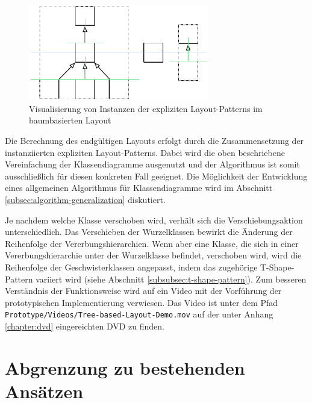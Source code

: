 \begin{figure}[hbt]
    \centering
    \includegraphics[width=0.7\textwidth]{resources/tree-based-layout}
    \caption{Visualisierung von Instanzen der expliziten Layout-Patterns im baumbasierten Layout}
    \label{fig:tree-based-layout}
\end{figure}

Die Berechnung des endgültigen Layouts erfolgt durch die Zusammensetzung der instanziierten expliziten Layout-Patterns. Dabei wird die oben beschriebene Vereinfachung der Klassendiagramme ausgenutzt und der Algorithmus ist somit ausschließlich für diesen konkreten Fall geeignet. Die Möglichkeit der Entwicklung eines allgemeinen Algorithmus für Klassendiagramme wird im Abschnitt \ref{subsec:algorithm-generalization} diskutiert.

Je nachdem welche Klasse verschoben wird, verhält sich die Verschiebungsaktion unterschiedlich. Das Verschieben der Wurzelklassen bewirkt die Änderung der Reihenfolge der Vererbungshierarchien. Wenn aber eine Klasse, die sich in einer Vererbungshierarchie unter der Wurzelklasse befindet, verschoben wird, wird die Reihenfolge der Geschwisterklassen angepasst, indem das zugehörige T-Shape-Pattern variiert wird (siehe Abschnitt \ref{subsubsec:t-shape-pattern}). Zum besseren Verständnis der Funktionsweise wird auf ein Video mit der Vorführung der prototypischen Implementierung verwiesen. Das Video ist unter dem Pfad \texttt{Prototype/Videos/Tree-based-Layout-\-De\-mo.mov} auf der unter Anhang \ref{chapter:dvd} eingereichten DVD zu finden.


\section{Abgrenzung zu bestehenden Ansätzen}
\label{sec:current-approaches-comparison}


